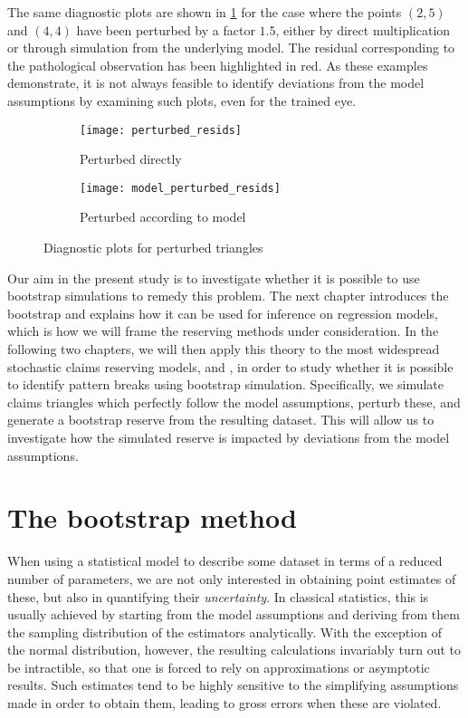 \documentclass[a4paper]{book}
\begin{document}
The same diagnostic plots are shown in \cref{fig:diag-plot-perturbed} for the case where the points $(2, 5)$ and $(4, 4)$ have been perturbed by a factor $1.5$, either by direct multiplication or through simulation from the underlying model. The residual corresponding to the pathological observation has been highlighted in red. As these examples demonstrate, it is not always feasible to identify deviations from the model assumptions by examining such plots, even for the trained eye.

\begin{figure}[!htb]
  \centering
  \begin{subfigure}{\textwidth}
    \texttt{[image: perturbed\_resids]}
    \caption{Perturbed directly}
  \end{subfigure}
  \begin{subfigure}{\textwidth}
    \texttt{[image: model\_perturbed\_resids]}
    \caption{Perturbed according to model}
  \end{subfigure}
  \caption{Diagnostic plots for perturbed triangles}
  \label{fig:diag-plot-perturbed}
\end{figure}

Our aim in the present study is to investigate whether it is possible to use bootstrap simulations to remedy this problem. The next chapter introduces the bootstrap and explains how it can be used for inference on regression models, which is how we will frame the reserving methods under consideration. In the following two chapters, we will then apply this theory to the most widespread stochastic claims reserving models,  and , in order to study whether it is possible to identify pattern breaks using bootstrap simulation. Specifically, we simulate claims triangles which perfectly follow the model assumptions, perturb these, and generate a bootstrap reserve from the resulting dataset. This will allow us to investigate how the simulated reserve is impacted by deviations from the model assumptions.

\chapter{The bootstrap method} \label{chapter:boot}

When using a statistical model to describe some dataset in terms of a reduced number of parameters, we are not only interested in obtaining point estimates of these, but also in quantifying their \emph{uncertainty}. In classical statistics, this is usually achieved by starting from the model assumptions and deriving from them the sampling distribution of the estimators analytically. With the exception of the normal distribution, however, the resulting calculations invariably turn out to be intractible, so that one is forced to rely on approximations or asymptotic results. Such estimates tend to be highly sensitive to the simplifying assumptions made in order to obtain them, leading to gross errors when these are violated.
\end{document}
